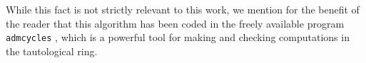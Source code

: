 \documentclass[leqno,12pt]{amsart}
\newtheorem{theorem}{Theorem}[section]
\theoremstyle{remark}
\numberwithin{equation}{section}
\newcommand{\renzo}{}
\newcommand{\Matthew}{}
\begin{document}
While this fact is not strictly relevant to this work, we mention for the benefit of the reader that this algorithm has been coded in the freely available program {\tt admcycles} \cite{delecroix2022admcycles}, which is a powerful tool for making and checking computations in the tautological ring.%


\end{document}
